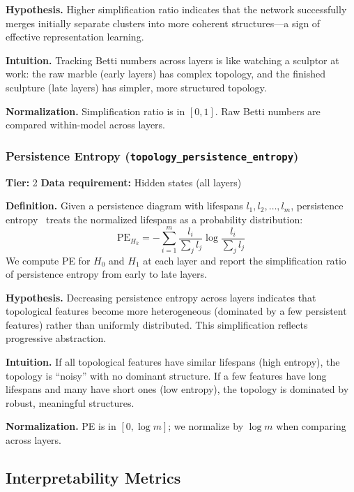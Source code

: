 \documentclass[preprint]{neurips_2025}
\begin{document}
\textbf{Hypothesis.}
Higher simplification ratio indicates that the network successfully merges initially separate clusters into more coherent structures---a sign of effective representation learning.

\textbf{Intuition.}
Tracking Betti numbers across layers is like watching a sculptor at work: the raw marble (early layers) has complex topology, and the finished sculpture (late layers) has simpler, more structured topology.

\textbf{Normalization.} Simplification ratio is in $[0, 1]$. Raw Betti numbers are compared within-model across layers.

\subsubsection{Persistence Entropy (\texttt{topology\_persistence\_entropy})}
\label{app:persistence-entropy}

\textbf{Tier:} 2 \quad \textbf{Data requirement:} Hidden states (all layers)

\textbf{Definition.}
Given a persistence diagram with lifespans $l_1, l_2, \ldots, l_m$, persistence entropy~\citep{rucco2016characterisation} treats the normalized lifespans as a probability distribution:
\begin{equation}
  \text{PE}_{H_k} = -\sum_{i=1}^{m} \frac{l_i}{\sum_j l_j} \log \frac{l_i}{\sum_j l_j}
\end{equation}
We compute PE for $H_0$ and $H_1$ at each layer and report the simplification ratio of persistence entropy from early to late layers.

\textbf{Hypothesis.}
Decreasing persistence entropy across layers indicates that topological features become more heterogeneous (dominated by a few persistent features) rather than uniformly distributed. This simplification reflects progressive abstraction.

\textbf{Intuition.}
If all topological features have similar lifespans (high entropy), the topology is ``noisy'' with no dominant structure. If a few features have long lifespans and many have short ones (low entropy), the topology is dominated by robust, meaningful structures.

\textbf{Normalization.} PE is in $[0, \log m]$; we normalize by $\log m$ when comparing across layers.

\subsection{Interpretability Metrics}
\label{app:interpretability}
\end{document}

